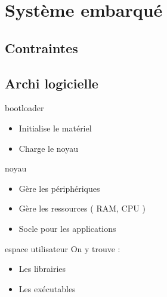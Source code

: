 \section{Système embarqué}
\subsection{Contraintes}
\subsection{Archi logicielle}

\begin{frame}

	\begin{block}{bootloader}
		\begin{itemize}
			\item Initialise le matériel
			\item Charge le noyau
		\end{itemize}
	\end{block}

	\begin{block}{noyau}
		\begin{itemize}
			\item Gère les périphériques
			\item Gère les ressources ( RAM, CPU )
			\item Socle pour les applications
		\end{itemize}
	\end{block}

	\begin{block}{espace utilisateur}
		On y trouve :
		\begin{itemize}
			\item Les librairies
			\item Les exécutables
		\end{itemize}
	\end{block}

\end{frame}

